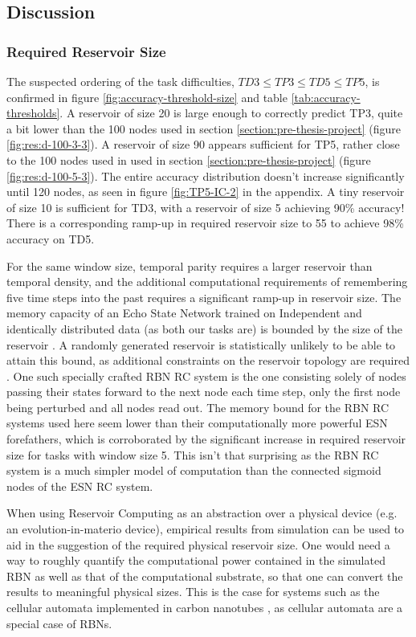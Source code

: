 \subsection{Discussion}

\subsubsection{Required Reservoir Size}

The suspected ordering of the task difficulties,
$ TD3 \leq TP3 \leq TD5 \leq TP5 $,
is confirmed in figure \ref{fig:accuracy-threshold-size} and table \ref{tab:accuracy-thresholds}.
A reservoir of size 20 is large enough to correctly predict TP3,
quite a bit lower than the 100 nodes used in section \ref{section:pre-thesis-project} (figure \ref{fig:res:d-100-3-3}).
A reservoir of size 90 appears sufficient for TP5, rather close to the 100 nodes used in used in section \ref{section:pre-thesis-project} (figure \ref{fig:res:d-100-5-3}).
The entire accuracy distribution doesn't increase significantly until 120 nodes,
as seen in figure \ref{fig:TP5-IC-2} in the appendix.
A tiny reservoir of size 10 is sufficient for TD3,
with a reservoir of size 5 achieving 90\% accuracy!
There is a corresponding ramp-up in required reservoir size to 55 to achieve 98\% accuracy on TD5.

For the same window size, temporal parity requires a larger reservoir than temporal density,
and the additional computational requirements of remembering five time steps into the past requires a significant ramp-up in reservoir size.
The memory capacity of an Echo State Network trained on Independent and identically distributed data (as both our tasks are) is bounded by the size of the reservoir \cite{Jaeger:2007}.
A randomly generated reservoir is statistically unlikely to be able to attain this bound,
as additional constraints on the reservoir topology are required \cite{Jaeger:2007}.
One such specially crafted RBN RC system is the one consisting solely of nodes passing their states forward to the next node each time step,
only the first node being perturbed and all nodes read out.
The memory bound for the RBN RC systems used here seem lower than their computationally more powerful ESN forefathers,
which is corroborated by the significant increase in required reservoir size for tasks with window size 5.
This isn't that surprising as the RBN RC system is a much simpler model of computation than the connected sigmoid nodes of the ESN RC system.

When using Reservoir Computing as an abstraction over a physical device (e.g. an evolution-in-materio device),
empirical results from simulation can be used to aid in the suggestion of the required physical reservoir size.
One would need a way to roughly quantify the computational power contained in the simulated RBN as well as that of the computational substrate,
so that one can convert the results to meaningful physical sizes.
This is the case for systems such as the cellular automata implemented in carbon nanotubes \cite{farstad2015evolving},
as cellular automata are a special case of RBNs.

